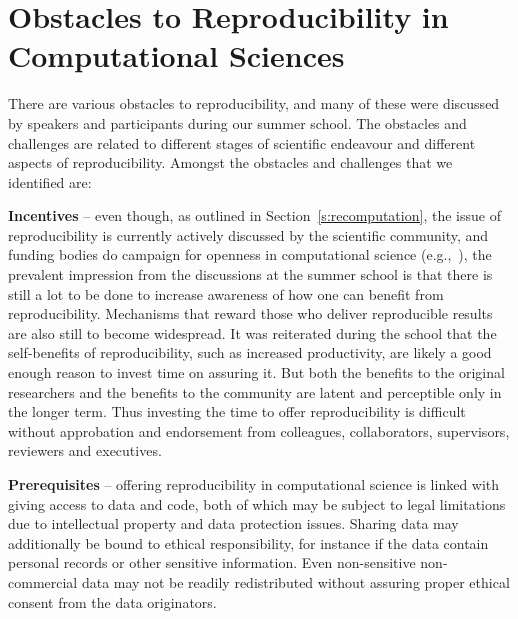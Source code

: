\section{Obstacles to Reproducibility in Computational Sciences}
\label{s:obstacles}

There are various obstacles to reproducibility, and many of these were
  discussed by speakers and participants during our summer school.
The obstacles and challenges are related to different stages of scientific 
  endeavour and different aspects of reproducibility.
Amongst the obstacles and challenges that we identified are:

{\bf Incentives} -- even though, as outlined in Section~\ref{s:recomputation}, 
  the issue of reproducibility is
  currently actively discussed by the scientific community, 
  and funding bodies do campaign for
  openness in computational science (e.g.,~\cite{NSF}), 
  the prevalent impression from the discussions at 
  the summer school is that there is still a lot to be done to increase 
  awareness of how one can benefit from reproducibility.
Mechanisms that reward those who deliver reproducible results are also
  still to become widespread.
It was reiterated during the school that the self-benefits 
  of reproducibility, such as increased productivity, are likely 
  a good enough reason to invest time on assuring it.
But both the benefits to the original researchers and the benefits to the community
  are latent and perceptible only in the longer term.
Thus investing the time to offer reproducibility is difficult without
  approbation and endorsement from colleagues, collaborators, supervisors,
  reviewers and executives.
  
{\bf Prerequisites} -- offering reproducibility in computational
  science is linked with giving access to data and code, both of which may
  be subject to legal limitations due to intellectual property and
  data protection issues.
Sharing data may additionally be bound to ethical responsibility, for instance
  if the data contain personal records or other sensitive information.  
Even non-sensitive non-commercial data may not be readily redistributed
  without assuring proper ethical consent from the data originators.

